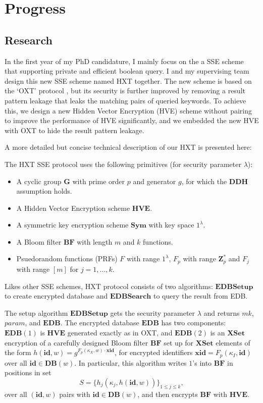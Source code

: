 \chapter{Progress}
\section{Research}
In the first year of my PhD candidature, I mainly focus on the a SSE scheme that supporting private and efficient boolean query. I and my supervising team design this new SSE scheme named HXT together. The new scheme is based on the `OXT' protocol \cite{cash2013highly}, but its security is further improved by removing a result pattern leakage that leaks the matching pairs of queried keywords. To achieve this, we design a new Hidden Vector Encryption (HVE) scheme without pairing to improve the performance of HVE significantly, and we embedded the new HVE with OXT to hide the result pattern leakage.

A more detailed but concise technical description of our HXT is presented here:

The HXT SSE protocol uses the following primitives (for security parameter $\lambda$):
\begin{itemize}
\setlength{\itemsep}{0pt}
\item A cyclic group $\mathbf{G}$ with prime order $p$ and generator $g$, for which the $\mathbf{DDH}$ assumption holds.
\item A Hidden Vector Encryption scheme $\mathbf{HVE}$.
\item A symmetric key encryption scheme $\mathbf{Sym}$ with key space $1^{\lambda}$.
\item A Bloom filter $\mathbf{BF}$ with length $m$ and $k$ functions.
\item Psuedorandom functions (PRFs) $F$ with range $1^{\lambda}$, $F_p$ with range $\mathbf{Z}^\ast_p$ and  $F_j$ with range $[m]$ for $j=1,\ldots,k$.
\end{itemize}

Likes other SSE schemes, HXT protocol consists of two algorithms: $\mathbf{EDBSetup}$ to create encrypted database and $\mathbf{EDBSearch}$ to query the result from EDB.
 
The setup algorithm $\mathbf{EDBSetup}$ gets the security parameter $\lambda$ and returns $mk$, $param$, and $\mathbf{EDB}$. The encrypted database $\mathbf{EDB}$ has two components: $\mathbf{EDB}(1)$ is $\mathbf{HVE}$  generated exactly as in OXT, and $\mathbf{EDB}(2)$ is an $\mathbf{XSet}$ encryption of a carefully designed Bloom filter $\mathbf{BF}$ set up for $\mathbf{XSet}$ elements of the form $h (\mathbf{id}, w) = g^{F_p (\kappa_X, w ) \cdot \mathbf{xid}}$, for encrypted identifiers $\mathbf{xid}=F_p(\kappa_I,\mathbf{id})$ over all $\mathbf{id}\in\mathbf{DB}(w)$. In particular, this algorithm writes $1$'s into $\mathbf{BF}$ in positions in set 
$$S =\{h_j(\kappa_j,h(\mathbf{id},w))\}_{1\leq j \leq k},$$ 
over all $(\mathbf{id},w)$ pairs with $\mathbf{id}\in\mathbf{DB}(w)$, and then encrypts $\mathbf{BF}$ with $\mathbf{HVE}$.

